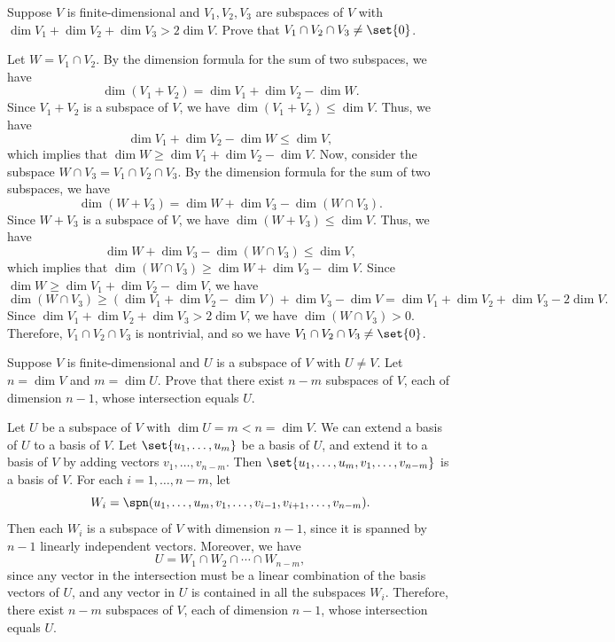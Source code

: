 \begin{exercise}[2c15]
    Suppose $V$ is finite-dimensional and $V_1, V_2, V_3$ are subspaces of $V$ with $\dim V_1 + \dim V_2 + \dim V_3 > 2 \dim V$. Prove that $V_1 \cap V_2 \cap V_3 \neq \set{0}$.
\end{exercise}

\begin{sol}
    Let $W = V_1 \cap V_2$. By the dimension formula for the sum of two subspaces, we have
    \[\dim(V_1 + V_2) = \dim V_1 + \dim V_2 - \dim W.\]
    Since $V_1 + V_2$ is a subspace of $V$, we have $\dim(V_1 + V_2) \leq \dim V$. Thus, we have
    \[\dim V_1 + \dim V_2 - \dim W \leq \dim V,\]
    which implies that $\dim W \geq \dim V_1 + \dim V_2 - \dim V$. Now, consider the subspace $W \cap V_3 = V_1 \cap V_2 \cap V_3$. By the dimension formula for the sum of two subspaces, we have
    \[\dim(W + V_3) = \dim W + \dim V_3 - \dim(W \cap V_3).\]
    Since $W + V_3$ is a subspace of $V$, we have $\dim(W + V_3) \leq \dim V$. Thus, we have
    \[\dim W + \dim V_3 - \dim(W \cap V_3) \leq \dim V,\]
    which implies that $\dim(W \cap V_3) \geq \dim W + \dim V_3 - \dim V$. Since $\dim W \geq \dim V_1 + \dim V_2 - \dim V$, we have
    \[\dim(W \cap V_3) \geq (\dim V_1 + \dim V_2 - \dim V) + \dim V_3 - \dim V = \dim V_1 + \dim V_2 + \dim V_3 - 2 \dim V.\]
    Since $\dim V_1 + \dim V_2 + \dim V_3 > 2 \dim V$, we have $\dim(W \cap V_3) > 0$. Therefore, $V_1 \cap V_2 \cap V_3$ is nontrivial, and so we have $V_1 \cap V_2 \cap V_3 \neq \set{0}$.
\end{sol}

\begin{exercise}[2c16]
    Suppose $V$ is finite-dimensional and $U$ is a subspace of $V$ with $U \neq V$. Let $n = \dim V$ and $m = \dim U$. Prove that there exist $n - m$ subspaces of $V$, each of dimension $n - 1$, whose intersection equals $U$.
\end{exercise}

\begin{sol}
    Let $U$ be a subspace of $V$ with $\dim U = m < n = \dim V$. We can extend a basis of $U$ to a basis of $V$. Let $\set{u_1, \ldots, u_m}$ be a basis of $U$, and extend it to a basis of $V$ by adding vectors $v_1, \ldots, v_{n - m}$. Then $\set{u_1, \ldots, u_m, v_1, \ldots, v_{n - m}}$ is a basis of $V$. For each $i = 1, \ldots, n - m$, let
    \[W_i = \spn(u_1, \ldots, u_m, v_1, \ldots, v_{i - 1}, v_{i + 1}, \ldots, v_{n - m}).\]
    Then each $W_i$ is a subspace of $V$ with dimension $n - 1$, since it is spanned by $n - 1$ linearly independent vectors. Moreover, we have
    \[U = W_1 \cap W_2 \cap \cdots \cap W_{n - m},\]
    since any vector in the intersection must be a linear combination of the basis vectors of $U$, and any vector in $U$ is contained in all the subspaces $W_i$. Therefore, there exist $n - m$ subspaces of $V$, each of dimension $n - 1$, whose intersection equals $U$.
\end{sol}

